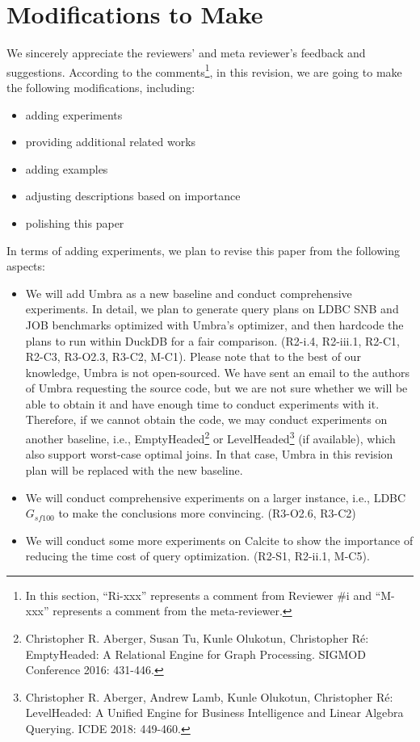 \section{Modifications to Make}
\label{sec:modifications}

We sincerely appreciate the reviewers' and meta reviewer's feedback and suggestions.
According to the comments\footnote{In this section, ``Ri-xxx'' represents a comment from Reviewer \#i and ``M-xxx'' represents a comment from the meta-reviewer.}, in this revision, we are going to make the following modifications, including:
\begin{itemize}
    \item adding experiments
    \item providing additional related works
    \item adding examples
    \item adjusting descriptions based on importance
    \item polishing this paper
\end{itemize}

In terms of adding experiments, we plan to revise this paper from the following aspects:
\begin{itemize}
    \item We will add Umbra as a new baseline and conduct comprehensive experiments. In detail, we plan to generate query plans on LDBC SNB and JOB benchmarks optimized with Umbra's optimizer, and then hardcode the plans to run within DuckDB for a fair comparison. (R2-i.4, R2-iii.1, R2-C1, R2-C3, R3-O2.3, R3-C2, M-C1). Please note that to the best of our knowledge, Umbra is not open-sourced. We have sent an email to the authors of Umbra requesting the source code, but we are not sure whether we will be able to obtain it and have enough time to conduct experiments with it.
    Therefore, if we cannot obtain the code, we may conduct experiments on another baseline, i.e., EmptyHeaded\footnote{Christopher R. Aberger, Susan Tu, Kunle Olukotun, Christopher Ré: EmptyHeaded: A Relational Engine for Graph Processing. SIGMOD Conference 2016: 431-446.} or LevelHeaded\footnote{Christopher R. Aberger, Andrew Lamb, Kunle Olukotun, Christopher Ré:
    LevelHeaded: A Unified Engine for Business Intelligence and Linear Algebra Querying. ICDE 2018: 449-460.} (if available), which also support worst-case optimal joins. In that case, Umbra in this revision plan will be replaced with the new baseline.
    \item We will conduct comprehensive experiments on a larger instance, i.e., LDBC $G_{sf100}$ to make the conclusions more convincing. (R3-O2.6, R3-C2)
    \item We will conduct some more experiments on Calcite to show the importance of reducing the time cost of query optimization. (R2-S1, R2-ii.1, M-C5).
\end{itemize}

